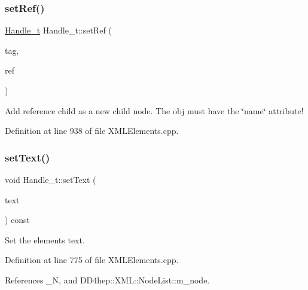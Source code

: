\subsubsection{\texorpdfstring{set\+Ref()}{setRef()}\hspace{0.1cm}{\footnotesize\ttfamily [2/2]}}
{\footnotesize\ttfamily \hyperlink{class_d_d4hep_1_1_x_m_l_1_1_handle__t}{Handle\+\_\+t} Handle\+\_\+t\+::set\+Ref (\begin{DoxyParamCaption}\item[{const \hyperlink{namespace_d_d4hep_1_1_x_m_l_a09e5d9cc86ed782f6826dfe0778c1815}{Xml\+Char} $\ast$}]{tag,  }\item[{const std\+::string \&}]{ref }\end{DoxyParamCaption})}



Add reference child as a new child node. The obj must have the \char`\"{}name\char`\"{} attribute! 



Definition at line 938 of file X\+M\+L\+Elements.\+cpp.

\hypertarget{class_d_d4hep_1_1_x_m_l_1_1_handle__t_abe16e6995181e0e0fc847f46cf760d7c}{}\label{class_d_d4hep_1_1_x_m_l_1_1_handle__t_abe16e6995181e0e0fc847f46cf760d7c} 
\subsubsection{\texorpdfstring{set\+Text()}{setText()}\hspace{0.1cm}{\footnotesize\ttfamily [1/2]}}
{\footnotesize\ttfamily void Handle\+\_\+t\+::set\+Text (\begin{DoxyParamCaption}\item[{const \hyperlink{namespace_d_d4hep_1_1_x_m_l_a09e5d9cc86ed782f6826dfe0778c1815}{Xml\+Char} $\ast$}]{text }\end{DoxyParamCaption}) const}



Set the element\textquotesingle{}s text. 



Definition at line 775 of file X\+M\+L\+Elements.\+cpp.



References \+\_\+N, and D\+D4hep\+::\+X\+M\+L\+::\+Node\+List\+::m\+\_\+node.

